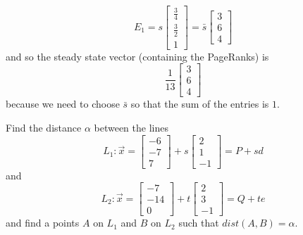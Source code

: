 \documentclass{article}
\begin{document}
\begin{Answer}
  \begin{equation*}
  E_1 = s \left[
  \begin{array}{c}
  \frac{3}{4}\\
  \frac{3}{2}\\
  1
  \end{array}
  \right] = \bar{s} \left[
  \begin{array}{c}
  3\\
  6\\
  4
  \end{array}
  \right]
  \end{equation*}
  and so the steady state vector (containing the PageRanks) is
  \begin{equation*}
  \frac{1}{13}
  \left[
  \begin{array}{c}
  3\\
  6\\
  4
  \end{array}
  \right]
  \end{equation*}
  because we need to choose $\bar{s}$ so that the sum of the entries is $1$.
\end{Answer}

\begin{Exercise}
  Find the distance $\alpha$ between the lines
\begin{equation*}
L_1: \vec{x} = \left[
\begin{matrix}
-6\\
-7\\
7
\end{matrix}
\right]+s
\left[
\begin{matrix}
2\\
1\\
-1
\end{matrix}
\right] = P+sd
\end{equation*}
and
\begin{equation*}
L_2: \vec{x} =
\left[
\begin{matrix}
-7\\
-14\\
0
\end{matrix}
\right]+ t \left[
\begin{matrix}
2\\
3\\
-1
\end{matrix}
\right] = Q + te
\end{equation*}
and find a points $A$ on $L_1$ and $B$ on $L_2$ such that $dist(A, B) = \alpha$.
\end{Exercise}
\end{document}
